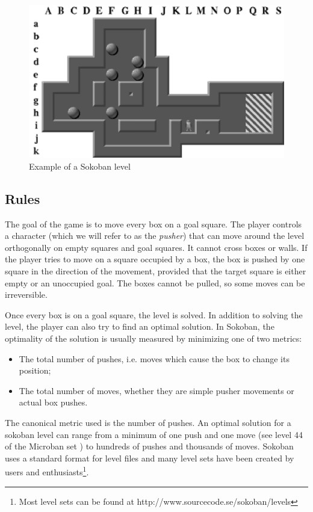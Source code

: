 \begin{figure}[!h]
\centering
\includegraphics[width=0.7\linewidth]{pictures/sokoban_1.png}
\caption[Example of a Sokoban level]{Example of a Sokoban level \cite{Junghanns99pushingthe}}
\label{fig:sokobanlevel}
\end{figure}

\subsection{Rules}
The goal of the game is to move every box on a goal square. The player controls a character (which we will refer to as the \textit{pusher}) that can move around the level orthogonally on empty squares and goal squares. It cannot cross boxes or walls. If the player tries to move on a square occupied by a box, the box is pushed by one square in the direction of the movement, provided that the target square is either empty or an unoccupied goal. The boxes cannot be pulled, so some moves can be irreversible.

\medskip\noindent
Once every box is on a goal square, the level is solved. In addition to solving the level, the player can also try to find an optimal solution. In Sokoban, the optimality of the solution is usually measured by minimizing one of two metrics:
\begin{itemize}
    \item The total number of pushes, i.e. moves which cause the box to change its position;
    \item The total number of moves, whether they are simple pusher movements or actual box pushes.
\end{itemize}
The canonical metric used is the number of pushes. An optimal solution for a sokoban level can range from a minimum of one push and one move (see level 44 of the Microban set \cite{microban}) to hundreds of pushes and thousands of moves. Sokoban uses a standard format for level files and many level sets have been created by users and enthusiasts\footnote{Most level sets can be found at http://www.sourcecode.se/sokoban/levels}.

